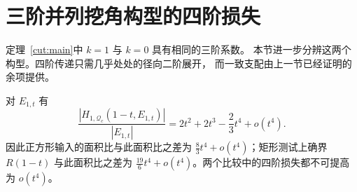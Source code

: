 \section{三阶并列挖角构型的四阶损失}\label{four:section}

定理~\ref{cut:main}中 $k=1$ 与 $k=0$ 具有相同的三阶系数。
本节进一步分辨这两个构型。四阶传递只需几乎处处的径向二阶展开，
而一致支配由上一节已经证明的余项提供。

\begin{theorem}[单位挖角比例的四阶项]\label{four:main}
对 $E_{1,t}$ 有
\begin{equation}\label{four:expansion}
 \frac{|H_{1,\mathcal Q_c}(1-t,E_{1,t})|}{|E_{1,t}|}
 =2t^2+2t^3-\frac23t^4+o(t^4).
\end{equation}
因此正方形输入的面积比与此面积比之差为
$\frac83t^4+o(t^4)$；矩形测试上确界 $R(1-t)$ 与此面积比之差为
$\frac{19}{6}t^4+o(t^4)$。两个比较中的四阶损失都不可提高为 $o(t^4)$。
\end{theorem}
